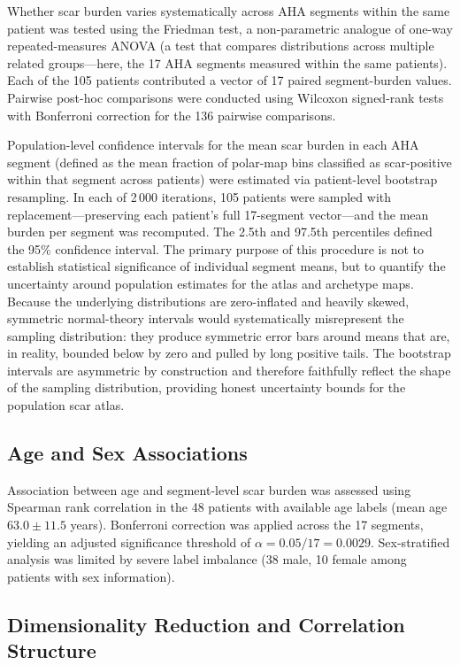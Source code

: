 Whether scar burden varies systematically across AHA segments within the same patient
was tested using the Friedman test, a non-parametric analogue of one-way repeated-measures
ANOVA (a test that compares distributions across multiple related groups---here, the 17 AHA
segments measured within the same patients). Each of the 105 patients contributed a vector
of 17 paired segment-burden values. Pairwise post-hoc comparisons were conducted using
Wilcoxon signed-rank tests with Bonferroni correction for the 136 pairwise comparisons.

Population-level confidence intervals for the mean scar burden in each AHA segment
(defined as the mean fraction of polar-map bins classified as scar-positive within that segment
across patients) were estimated via patient-level bootstrap resampling. In each of 2\,000
iterations, 105 patients were sampled with replacement---preserving each patient's full
17-segment vector---and the mean burden per segment was recomputed. The 2.5th and
97.5th percentiles defined the 95\% confidence interval. The primary purpose of this
procedure is not to establish statistical significance of individual segment means, but to
quantify the uncertainty around population estimates for the atlas and archetype maps.
Because the underlying distributions are zero-inflated and heavily skewed, symmetric
normal-theory intervals would systematically misrepresent the sampling distribution: they
produce symmetric error bars around means that are, in reality, bounded below by zero and
pulled by long positive tails. The bootstrap intervals are asymmetric by construction and
therefore faithfully reflect the shape of the sampling distribution, providing honest
uncertainty bounds for the population scar atlas.

\subsection{Age and Sex Associations}

Association between age and segment-level scar burden was assessed using Spearman
rank correlation in the 48 patients with available age labels (mean age $63.0 \pm 11.5$
years). Bonferroni correction was applied across the 17 segments, yielding an adjusted
significance threshold of $\alpha = 0.05/17 = 0.0029$. Sex-stratified analysis was limited by
severe label imbalance (38 male, 10 female among patients with sex information).

\subsection{Dimensionality Reduction and Correlation Structure}


